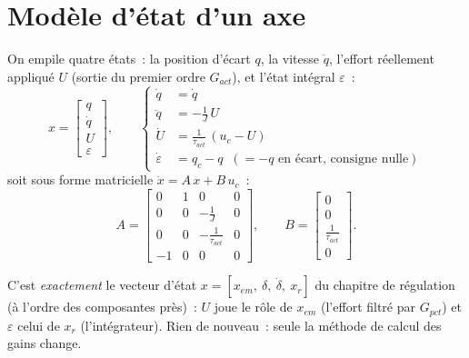 \documentclass[a4paper,11pt]{article}
\newcommand{\qm}{q}
\begin{document}
\section{Modèle d'état d'un axe}
\label{sec:etat}

On empile quatre états~: la position d'écart $\qm$, la vitesse $\dot{\qm}$,
l'effort réellement appliqué $U$ (sortie du premier ordre $G_{act}$), et
l'état intégral $\varepsilon$~:
\begin{equation}
    x = \begin{bmatrix} \qm \\ \dot{\qm} \\ U \\ \varepsilon \end{bmatrix},
    \qquad
    \left\{
    \begin{aligned}
        \dot{\qm}          &= \dot{\qm} \\
        \ddot{\qm}         &= -\tfrac{1}{J}\,U \\
        \dot{U}            &= \tfrac{1}{\tau_{act}}\,(u_c - U) \\
        \dot{\varepsilon}  &= \qm_c - \qm \;\;(= -\qm \text{ en écart, consigne nulle})
    \end{aligned}
    \right.
\end{equation}
soit sous forme matricielle $\dot{x} = A\,x + B\,u_c$~:
\begin{equation}
    A = \begin{bmatrix}
        0 & 1 & 0 & 0 \\
        0 & 0 & -\frac{1}{J} & 0 \\
        0 & 0 & -\frac{1}{\tau_{act}} & 0 \\
        -1 & 0 & 0 & 0
    \end{bmatrix},
    \qquad
    B = \begin{bmatrix} 0 \\ 0 \\ \frac{1}{\tau_{act}} \\ 0 \end{bmatrix}.
    \label{eq:AB}
\end{equation}

C'est \emph{exactement} le vecteur d'état $x = [x_{em},\ \delta,\ \dot\delta,\
x_r]$ du chapitre de régulation (à l'ordre des composantes près)~: $U$ joue le
rôle de $x_{em}$ (l'effort filtré par $G_{pct}$) et $\varepsilon$ celui de
$x_r$ (l'intégrateur). Rien de nouveau~: seule la méthode de calcul des gains
change.
\end{document}
